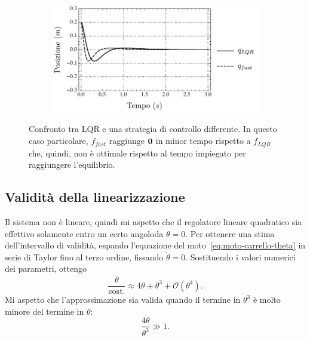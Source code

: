 \begin{figure}
    \begin{subfigure}[b]{.48\textwidth}
        \centering
        \includegraphics[width=\textwidth]{assets/nopt3}
    \end{subfigure}

    \caption[Confronto tra LQR e un controllo più rapido]{
        Confronto tra LQR e una strategia di controllo differente.
        In questo caso particolare, $f_{fast}$ raggiunge $\mathbf{0}$ in minor
        tempo rispetto a $f_{LQR}$ che, quindi, non è ottimale rispetto
        al tempo impiegato per raggiungere l'equilibrio.
    }
    \label{fig:non-ottimalità}
\end{figure}

\subsection{Validità della linearizzazione}
Il sistema non è lineare, quindi mi aspetto che il regolatore lineare quadratico sia
effettivo solamente entro un certo angolo\footnotemark da $\theta = 0$.
Per ottenere una stima dell'intervallo di validità, espando l'equazione del
moto~\eqref{eq:moto-carrello-theta} in serie di Taylor fino al terzo ordine,
fissando $\dot \theta = 0$.
Sostituendo i valori numerici dei parametri, ottengo
\begin{equation*}
    \frac {\ddot \theta} {\text{cost.}} \approx 4 \theta + \theta^3 + \mathcal O(\theta^4).
\end{equation*}
Mi aspetto che l'approssimazione sia valida quando il termine in $\theta^3$ è
molto minore del termine in $\theta$:
\begin{equation}
    \frac{4\theta} {\theta^3} \gg 1.
    \label{eq:rapporto-theta}
\end{equation}


